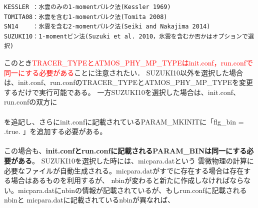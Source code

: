 \begin{verbatim}
KESSLER ：水雲のみの1-momentバルク法(Kessler 1969)
TOMITA08：氷雲を含む1-momentバルク法(Tomita 2008)
SN14    ：氷雲を含む2-momentバルク法(Seiki and Nakajima 2014)
SUZUKI10：1-momentビン法(Suzuki et al. 2010，氷雲を含むか否かはオプションで選択)
\end{verbatim}

このとき\textcolor{red}{TRACER\_TYPEとATMOS\_PHY\_MP\_TYPEはinit.conf，run.confで同一にする必要がある}ことに注意されたい．
SUZUKI10以外を選択した場合は、init.conf、run.confのTRACER\_TYPEとATMOS\_PHY\_MP\_TYPEを変更するだけで実行可能である。
一方SUZUKI10を選択した場合は、init.conf、run.confの双方に\\

\\

を追記し、さらにinit.confに記載されているPARAM\_MKINITに「flg\_bin = .true. 」を追加する必要がある。\\

\\

この場合も、{\bf init.confとrun.confに記載されるPARAM\_BINは同一にする必要がある}。
SUZUKI10を選択した時には、micpara.datという
雲微物理の計算に必要なファイルが自動生成される。micpara.datがすでに存在する場合は存在する場合はあるものを利用するが、
nbinが変わると新たに作成しなければならない。micpara.datにnbinの情報が記載されているが、もしrun.confに記載されるnbinと
micpara.datに記載されているnbinが異なれば、\\

\\

